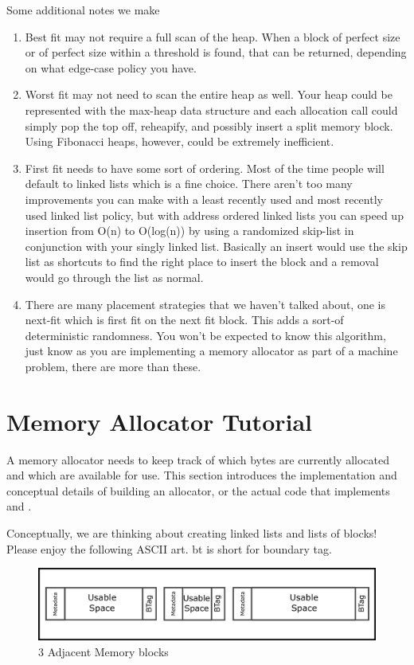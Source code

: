 Some additional notes we make

\begin{enumerate}
\item Best fit may not require a full scan of the heap. When a block of perfect size or of perfect size within a threshold is found, that can be returned, depending on what edge-case policy you have.
\item Worst fit may not need to scan the entire heap as well. Your heap could be represented with the max-heap data structure and each allocation call could simply pop the top off, reheapify, and possibly insert a split memory block.
  Using Fibonacci heaps, however, could be extremely inefficient.
\item First fit needs to have some sort of ordering. Most of the time people will default to linked lists which is a fine choice. There aren't too many improvements you can make with a least recently used and most recently used linked list policy, but with address ordered linked lists you can speed up insertion from O(n) to O(log(n)) by using a randomized skip-list in conjunction with your singly linked list.
  Basically an insert would use the skip list as shortcuts to find the right place to insert the block and a removal would go through the list as normal.
\item There are many placement strategies that we haven't talked about, one is next-fit which is first fit on the next fit block. This adds a sort-of deterministic randomness. You won't be expected to know this algorithm, just know as you are implementing a memory allocator as part of a machine problem, there are more than these.
  \end{enumerate}

\section{Memory Allocator Tutorial}

A memory allocator needs to keep track of which bytes are currently allocated and which are available for use.
This section introduces the implementation and conceptual details of building an allocator, or the actual code that implements  and .

Conceptually, we are thinking about creating linked lists and lists of blocks!
Please enjoy the following ASCII art.
bt is short for boundary tag.


\begin{figure}[H]
\centering
\includegraphics[width=.7\textwidth]{malloc/drawings/malloc_patching.eps}
\caption{3 Adjacent Memory blocks}
\end{figure}


